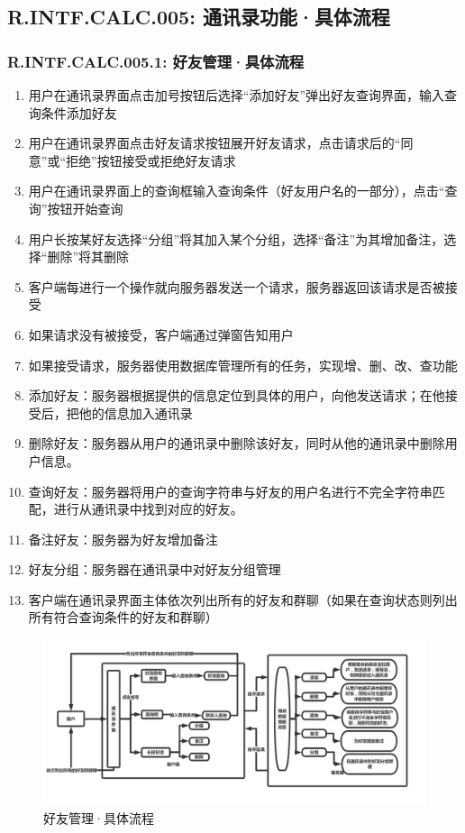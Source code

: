     \subsection{R.INTF.CALC.005: 通讯录功能·具体流程}
        \subsubsection{R.INTF.CALC.005.1: 好友管理·具体流程}
        \begin{enumerate}
            \item 用户在通讯录界面点击加号按钮后选择“添加好友”弹出好友查询界面，输入查询条件添加好友
            \item 用户在通讯录界面点击好友请求按钮展开好友请求，点击请求后的“同意”或“拒绝”按钮接受或拒绝好友请求
            \item 用户在通讯录界面上的查询框输入查询条件（好友用户名的一部分），点击“查询”按钮开始查询
            \item 用户长按某好友选择“分组”将其加入某个分组，选择“备注”为其增加备注，选择“删除”将其删除
            \item 客户端每进行一个操作就向服务器发送一个请求，服务器返回该请求是否被接受
            \item 如果请求没有被接受，客户端通过弹窗告知用户
            \item 如果接受请求，服务器使用数据库管理所有的任务，实现增、删、改、查功能
            \item 添加好友：服务器根据提供的信息定位到具体的用户，向他发送请求；在他接受后，把他的信息加入通讯录
            \item 删除好友：服务器从用户的通讯录中删除该好友，同时从他的通讯录中删除用户信息。
            \item 查询好友：服务器将用户的查询字符串与好友的用户名进行不完全字符串匹配，进行从通讯录中找到对应的好友。
            \item 备注好友：服务器为好友增加备注
            \item 好友分组：服务器在通讯录中对好友分组管理
            \item 客户端在通讯录界面主体依次列出所有的好友和群聊（如果在查询状态则列出所有符合查询条件的好友和群聊）
        \end{enumerate}
        \begin{figure}[h]
            \centering
            \includegraphics[scale=0.4]{OutlineDesign/figures/好友管理·具体流程.png}
            \caption{好友管理·具体流程}
            \label{fig:server_flow}
        \end{figure}
